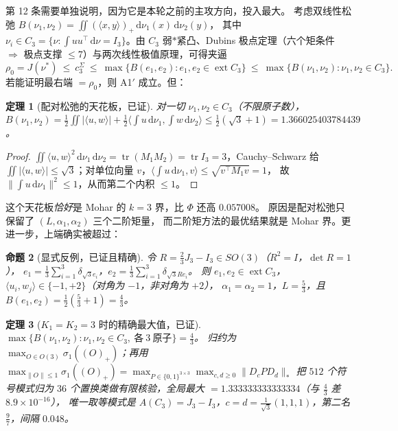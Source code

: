 \documentclass[UTF8,11pt]{ctexart}
\newtheorem{theorem}{定理}[section]
\newtheorem{proposition}[theorem]{命题}
\theoremstyle{definition}
\newcommand{\tr}{\operatorname{tr}}
\newcommand{\dd}{\,\mathrm{d}}
\begin{document}
第 12 条需要单独说明，因为它是本轮之前的主攻方向，投入最大。
考虑双线性松弛 $B(\nu_1,\nu_2)=\iint(\langle x,y\rangle)_+\dd\nu_1(x)\dd\nu_2(y)$，
其中 $\nu_i\in C_3=\{\nu:\int uu^\top\dd\nu=I_3\}$。由 $C_3$ 弱$*$紧凸、Dubins 极点定理（六个矩条件
$\Rightarrow$ 极点支撑 $\le7$）与两次线性极值原理，可得夹逼
\[
\rho_0=J(\nu^*)\ \le\ c_3^{\Sigma}\ \le\ \max\{B(e_1,e_2):e_1,e_2\in\operatorname{ext}C_3\}
\ \le\ \max\{B(\nu_1,\nu_2):\nu_1,\nu_2\in C_3\}.
\]
若能证明最右端 $=\rho_0$，则 A1$'$ 成立。但：

\begin{theorem}[配对松弛的天花板，已证]\label{thm:43A}
对一切 $\nu_1,\nu_2\in C_3$（不限原子数），
$B(\nu_1,\nu_2)=\frac12\iint|\langle u,w\rangle|+\frac12\langle\!\int u\dd\nu_1,\int w\dd\nu_2\rangle
\le\frac12(\sqrt3+1)=1.366025403784439$。
\end{theorem}

\begin{proof}
$\iint\langle u,w\rangle^2\dd\nu_1\dd\nu_2=\tr(M_1M_2)=\tr I_3=3$，Cauchy--Schwarz 给
$\iint|\langle u,w\rangle|\le\sqrt3$；对单位向量 $v$，$\langle\int u\dd\nu_1,v\rangle\le\sqrt{v^\top M_1v}=1$，
故 $\|\int u\dd\nu_1\|^2\le1$，从而第二个内积 $\le1$。
\end{proof}

这个天花板\emph{恰好}是 Mohar 的 $k=3$ 界，比 $\Phi$ 还高 $0.057008$。
原因是配对松弛只保留了 $(L,\alpha_1,\alpha_2)$ 三个二阶矩量，
而二阶矩方法的最优结果就是 Mohar 界。更进一步，上端确实被超过：

\begin{proposition}[显式反例，已证且精确]\label{prop:43B}
令 $R=\frac23J_3-I_3\in SO(3)$（$R^2=I$，$\det R=1$），
$e_1=\frac13\sum_{i=1}^3\delta_{\sqrt3e_i}$，$e_2=\frac13\sum_{i=1}^3\delta_{\sqrt3Re_i}$。
则 $e_1,e_2\in\operatorname{ext}C_3$，$\langle u_i,w_j\rangle\in\{-1,+2\}$（对角为 $-1$，非对角为 $+2$），
$\alpha_1=\alpha_2=1$，$L=\frac53$，且 $B(e_1,e_2)=\frac12(\frac53+1)=\frac43$。
\end{proposition}

\begin{theorem}[$K_1=K_2=3$ 时的精确最大值，已证]\label{thm:43C}
$\max\{B(\nu_1,\nu_2):\nu_1,\nu_2\in C_3,\ \text{各}\ 3\ \text{原子}\}=\frac43$。
归约为 $\max_{O\in O(3)}\sigma_1((O)_+)$；再用
$\max_{\|O\|\le1}\sigma_1((O)_+)=\max_{P\in\{0,1\}^{3\times3}}\max_{c,d\ge0}\|D_cPD_d\|_*$
把 $512$ 个符号模式归为 $36$ 个置换类做有限核验，全局最大 $=1.333333333333334$（与 $\frac43$ 差 $8.9\times10^{-16}$），
唯一取等模式是 $A(C_3)=J_3-I_3$，$c=d=\frac1{\sqrt3}(1,1,1)$，第二名 $\frac97$，间隔 $0.048$。
\end{theorem}
\end{document}
